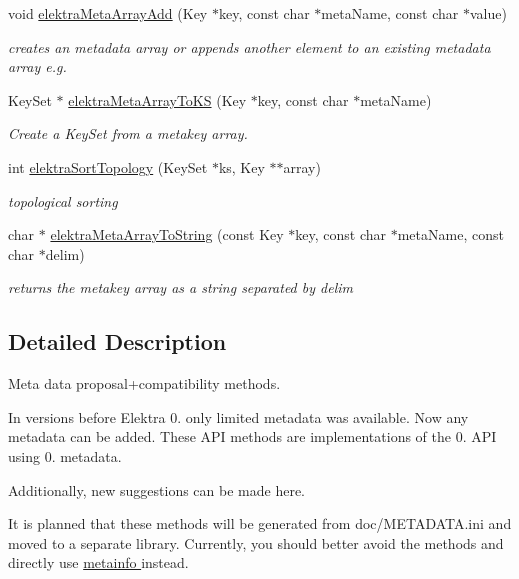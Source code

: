 \begin{DoxyCompactItemize}
void \hyperlink{group__meta_ga166c65c4eb2d758ced57b0bd74fb9a57}{elektra\+Meta\+Array\+Add} (Key $\ast$key, const char $\ast$meta\+Name, const char $\ast$value)
\begin{DoxyCompactList}\small\item\em creates an metadata array or appends another element to an existing metadata array e.\+g. \end{DoxyCompactList}\item 
Key\+Set $\ast$ \hyperlink{group__meta_gacee3e2d9285dd2bde975a09fdbe50502}{elektra\+Meta\+Array\+To\+KS} (Key $\ast$key, const char $\ast$meta\+Name)
\begin{DoxyCompactList}\small\item\em Create a {\ttfamily Key\+Set} from a metakey array. \end{DoxyCompactList}\item 
int \hyperlink{group__meta_gaadfae80314be2415a7654fe8a0d2ee82}{elektra\+Sort\+Topology} (Key\+Set $\ast$ks, Key $\ast$$\ast$array)
\begin{DoxyCompactList}\small\item\em topological sorting \end{DoxyCompactList}\item 
char $\ast$ \hyperlink{group__meta_ga40469799e2c6e9937eaf013bfc05d014}{elektra\+Meta\+Array\+To\+String} (const Key $\ast$key, const char $\ast$meta\+Name, const char $\ast$delim)
\begin{DoxyCompactList}\small\item\em returns the metakey array as a string separated by delim \end{DoxyCompactList}\end{DoxyCompactItemize}


\subsection{Detailed Description}
Meta data proposal+compatibility methods. 

In versions before Elektra 0. only limited metadata was available. Now any metadata can be added. These A\+PI methods are implementations of the 0. A\+PI using 0. metadata.

Additionally, new suggestions can be made here.

It is planned that these methods will be generated from doc/\+M\+E\+T\+A\+D\+A\+T\+A.\+ini and moved to a separate library. Currently, you should better avoid the methods and directly use \hyperlink{group__keymeta}{metainfo } instead. 

